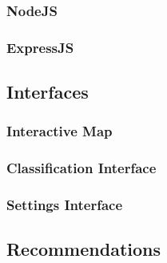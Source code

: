 \subsubsection{NodeJS}

\subsubsection{ExpressJS}


\subsection{Interfaces}
\subsubsection{Interactive Map}
\subsubsection{Classification Interface}
\subsubsection{Settings Interface}

\subsection{Recommendations}